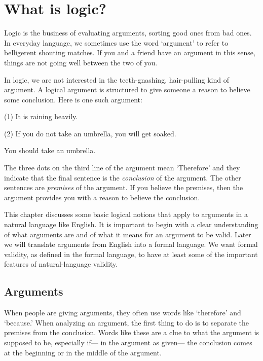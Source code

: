 \chapter{What is logic?}
\label{ch.intro}

Logic is the business of evaluating arguments, sorting good ones from bad ones. In everyday language, we sometimes use the word `argument' to refer to belligerent shouting matches. If you and a friend have an argument in this sense, things are not going well between the two of you.

In logic, we are not interested in the teeth-gnashing, hair-pulling kind of argument. A logical argument is structured to give someone a reason to believe some conclusion. Here is one such argument:

\label{argRaining}
\begin{earg}
\item[(1)] It is raining heavily.
\item[(2)] If you do not take an umbrella, you will get soaked.
\item[\therefore] You should take an umbrella.
\end{earg}

The three dots on the third line of the argument mean `Therefore' and they indicate that the final sentence is the \emph{conclusion} of the argument. The other sentences are \emph{premises} of the argument. If you believe the premises, then the argument provides you with a reason to believe the conclusion.

This chapter discusses some basic logical notions that apply to arguments in a natural language like English. It is important to begin with a clear understanding of what arguments are and of what it means for an argument to be valid. Later we will translate arguments from English into a formal language. We want formal validity, as defined in the formal language, to have at least some of the important features of natural-language validity.

\section{Arguments}
When people are giving arguments, they often use words like `therefore' and `because.' When analyzing an argument, the first thing to do is to separate the premises from the conclusion. Words like these are a clue to what the argument is supposed to be, especially if--- in the argument as given--- the conclusion comes at the beginning or in the middle of the argument.

